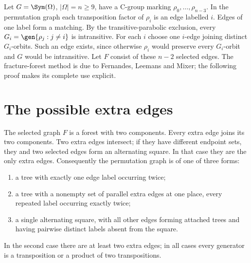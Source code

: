Let $G=\Sym(\Omega)$, $|\Omega|=n\geq9$, have a C-group marking
$\rho_0,\ldots,\rho_{n-3}$. In the permutation graph each transposition
factor of $\rho_i$ is an edge labelled $i$. Edges of one label form a
matching. By the transitive-parabolic exclusion, every
$G_i=\gen{\rho_j:j\ne i}$ is intransitive. For each $i$ choose one
$i$-edge joining distinct $G_i$-orbits. Such an edge exists, since
otherwise $\rho_i$ would preserve every $G_i$-orbit and $G$ would be
intransitive. Let $F$ consist of these $n-2$ selected edges.
The fracture-forest method is due to Fernandes, Leemans and Mixer;
the following proof makes its complete use explicit.

\section{The possible extra edges}
\begin{lemma}\label{lem:forest}
The selected graph $F$ is a forest with two components. Every extra
edge joins its two components. Two extra edges intersect; if they have
different endpoint sets, they and two selected edges form an alternating
square. In that case they are the only extra edges.
Consequently the permutation graph is of one of three forms:
\begin{enumerate}
\item a tree with exactly one edge label occurring twice;
\item a tree with a nonempty set of parallel extra edges at one place,
      every repeated label occurring exactly twice;
\item a single alternating square, with all other edges forming attached
      trees and having pairwise distinct labels absent from the square.
\end{enumerate}
In the second case there are at least two extra edges; in all cases
every generator is a transposition or a product of two transpositions.
\end{lemma}
